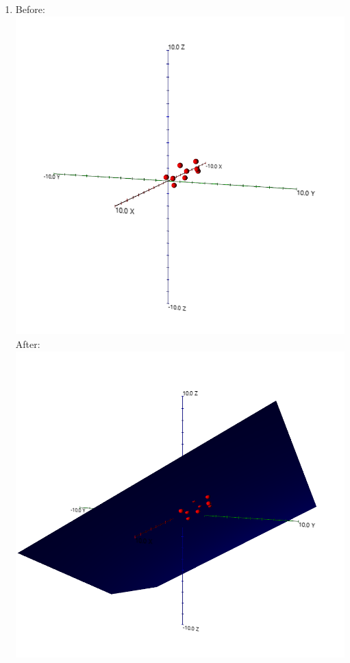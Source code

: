 \documentclass{article}
\begin{document}
\begin{enumerate}
\item Before:\\
\includegraphics[scale=0.4]{module7_exercise16_a}\\
After:\\
\includegraphics[scale=0.4]{module7_exercise16_b}


\end{enumerate}
\end{document}
